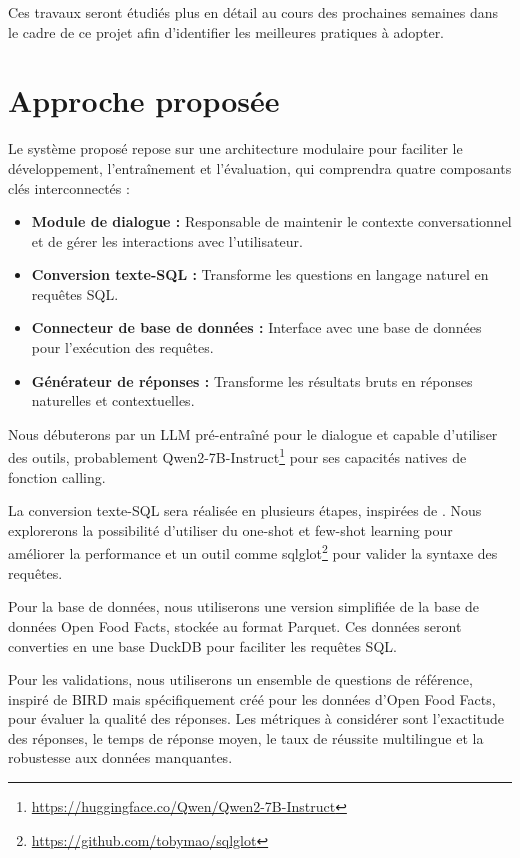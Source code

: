 \documentclass[a4paper,11pt]{article}
\begin{document}
Ces travaux seront étudiés plus en détail au cours des prochaines semaines dans le cadre de ce projet afin d'identifier les meilleures pratiques à adopter.




\section{Approche proposée}
\label{sec:approche}


Le système proposé repose sur une architecture modulaire pour faciliter le développement, l'entraînement et l'évaluation, qui 
comprendra quatre composants clés interconnectés :

\begin{itemize}
    \item \textbf{Module de dialogue :} Responsable de maintenir le contexte conversationnel et de gérer les interactions avec l'utilisateur. 
    \item \textbf{Conversion texte-SQL :} Transforme les questions en langage naturel en requêtes SQL. 
    \item \textbf{Connecteur de base de données :} Interface avec une base de données pour l'exécution des requêtes.
    \item \textbf{Générateur de réponses :} Transforme les résultats bruts en réponses naturelles et contextuelles.
\end{itemize}

Nous débuterons par un LLM pré-entraîné pour le dialogue et capable d'utiliser des outils, 
probablement Qwen2-7B-Instruct\footnote{\url{https://huggingface.co/Qwen/Qwen2-7B-Instruct}} pour ses capacités natives de fonction calling.

La conversion texte-SQL sera réalisée en plusieurs étapes, inspirées de \citet{biswal2024text2sql}. Nous explorerons la 
possibilité d'utiliser du one-shot et few-shot learning pour améliorer la performance et un outil comme sqlglot\footnote{\url{https://github.com/tobymao/sqlglot}} 
pour valider la syntaxe des requêtes.

Pour la base de données, nous utiliserons une version simplifiée de la base de données Open Food Facts, stockée au format Parquet.
Ces données seront converties en une base DuckDB pour faciliter les requêtes SQL.

Pour les validations, nous utiliserons un ensemble de questions de référence, inspiré de BIRD mais spécifiquement créé pour les données d'Open Food Facts, pour évaluer la qualité des réponses.
Les métriques à considérer sont l'exactitude des réponses, le temps de réponse moyen, le taux de réussite multilingue et la robustesse aux données manquantes.
\end{document}
